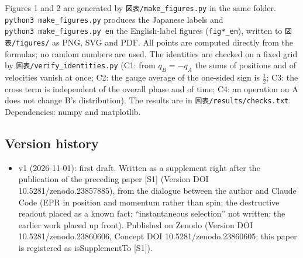 \documentclass[
  a4paper,
]{article}
\providecommand{\tightlist}{%
  \setlength{\itemsep}{0pt}\setlength{\parskip}{0pt}}
\begin{document}
Figures 1 and 2 are generated by \texttt{図表/\allowbreak{}make\_\allowbreak{}figures.py} in the
same folder. \texttt{python3\ make\_\allowbreak{}figures.py} produces the Japanese
labels and \texttt{python3\ make\_\allowbreak{}figures.py\ en} the English-label
figures (\texttt{fig*\_\allowbreak{}en}), written to \texttt{図表/\allowbreak{}figures/\allowbreak{}} as PNG,
SVG and PDF. All points are computed directly from the formulas; no
random numbers are used. The identities are checked on a fixed grid by
\texttt{図表/\allowbreak{}verify\_\allowbreak{}identities.py} (C1: from \(q_B=-q_A\) the sums of
positions and of velocities vanish at once; C2: the gauge average of the
one-sided sign is \(\tfrac12\); C3: the cross term is independent of the
overall phase and of time; C4: an operation on A does not change B's
distribution). The results are in \texttt{図表/\allowbreak{}results/\allowbreak{}checks.txt}.
Dependencies: numpy and matplotlib.

\subsection{Version history}\label{version-history}

\begin{itemize}
\tightlist
\item
  v1 (2026-11-01): first draft. Written as a supplement right after the
  publication of the preceding paper {[}S1{]} (Version DOI
  10.5281/zenodo.23857885), from the dialogue between the author and
  Claude Code (EPR in position and momentum rather than spin; the
  destructive readout placed as a known fact; ``instantaneous
  selection'' not written; the earlier work placed up front). Published
  on Zenodo (Version DOI 10.5281/zenodo.23860606, Concept DOI
  10.5281/zenodo.23860605; this paper is registered as isSupplementTo
  {[}S1{]}).
\end{itemize}
\end{document}
